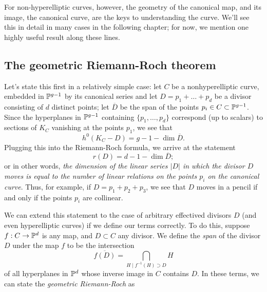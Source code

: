 For non-hyperelliptic curves, however, the geometry of the canonical map, and its image, the canonical curve, are the keys to understanding the curve. We'll see this in detail in many cases in the following chapter; for now, we mention one highly useful result along these lines.




\subsection{The geometric Riemann-Roch theorem}

Let's state this first in a relatively simple case: let $C$ be a nonhyperelliptic curve, embedded in ${\mathbb P}^{g-1}$ by its canonical series and let $D = p_1+\dots + p_d$ be a divisor consisting of $d$ distinct points; let $\overline D$ be the span of the points $p_i \in C \subset {\mathbb P}^{g-1}$. Since the hyperplanes in ${\mathbb P}^{g-1}$ containing $\{p_1,\dots,p_d\}$ correspond (up to scalars) to sections of $K_C$ vanishing at the points $p_1$, we see that
$$
h^0(K_C-D) = g - 1 - \dim \overline D.
$$
Plugging this into the Riemann-Roch formula, we arrive at the statement
$$
r(D) = d - 1 - \dim \overline D;
$$
or in other words, \emph{the dimension of the linear series $|D|$ in which the divisor $D$ moves is equal to the number of linear relations on the points $p_i$ on the canonical curve}. Thus, for example, if $D = p_1+p_2+p_3$, we see that $D$ moves in a pencil if and only if the points $p_i$ are collinear.

We can extend this statement to the case of arbitrary effectived divisors $D$ (and even hyperelliptic curves) if we define our terms correctly. To do this, suppose $f : C \to {\mathbb P}^d$ is any map, and $D \subset C$ any divisor. We define the \emph{span} of the divisor $D$ under the map $f$ to be the intersection
$$
\overline{f(D)} = \bigcap_{H \mid f^{-1}(H)\supset D} H 
$$
of all hyperplanes in ${\mathbb P}^d$ whose inverse image in $C$ contains $D$. In these terms, we can state the \emph{geometric Riemann-Roch} as

